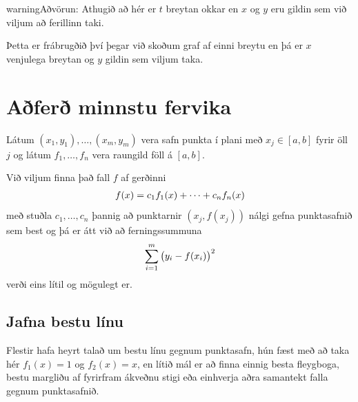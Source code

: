 \documentclass[letterpaper,10pt,icelandic]{sphinxmanual}
\begin{document}
\begin{notice}{warning}{Aðvörun:}
Athugið að hér er \(t\) breytan okkar en \(x\) og \(y\) eru gildin sem við
viljum að ferillinn taki.

Þetta er frábrugðið því þegar við skoðum graf af einni breytu en þá er
\(x\) venjulega breytan og \(y\) gildin sem viljum taka.
\end{notice}


\section{Aðferð minnstu fervika}
\label{kafli03:index-23}\label{kafli03:afer-minnstu-fervika}
Látum \((x_1,y_1),\dots,(x_m,y_m)\) vera safn punkta í plani með
\(x_j\in
[a,b]\) fyrir öll \(j\) og látum \(f_1,\dots,f_n\) vera raungild
föll á \([a,b]\).

Við viljum finna það fall \(f\) af gerðinni
\begin{gather}
\begin{split}f(x)=c_1f_1(x) + \cdots + c_nf_n(x)\end{split}\notag
\end{gather}
með stuðla \(c_1, \ldots, c_n\) þannig að punktarnir
\((x_j,f(x_j))\) nálgi gefna punktasafnið sem best og þá er átt við
að ferningssummuna
\begin{gather}
\begin{split}\sum_{i=1}^m\big(y_i-f(x_i)\big)^2\end{split}\notag
\end{gather}
verði eins lítil og mögulegt er.


\subsection{Jafna bestu línu}
\label{kafli03:index-24}\label{kafli03:jafna-bestu-linu}
Flestir hafa heyrt talað um bestu línu gegnum punktasafn, hún fæst með
að taka hér \(f_1(x) = 1\) og \(f_2(x) = x\), en lítið mál er að
finna einnig besta fleygboga, bestu margliðu af fyrirfram ákveðnu stigi
eða einhverja aðra samantekt falla gegnum punktasafnið.
\end{document}
